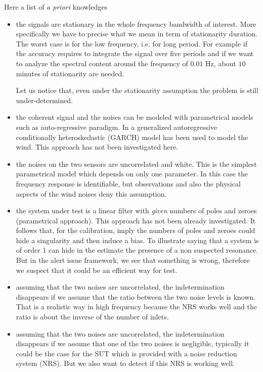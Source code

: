Here a list of {\it a priori} knowledges
\begin{itemize}
\item
 the signals are stationary in the whole frequency bandwidth of interest. More specifically we have to precise what we mean in term of stationarity duration. The worst case  is for the low frequency, i.e. for long period. For example if the accuracy requires to integrate the signal over five periods and if we want to analyze the spectral content around the frequency of $0.01$ Hz, about $10$ minutes of stationarity are needed.
 
Let us notice that, even under the stationarity assumption the problem is still under-determined.
 

  \item
the coherent signal and the noises can be modeled with parametrical models such as auto-regressive paradigm. In \cite{frazier:2013} a generalized autoregressive conditionally heteroskedastic (GARCH) model has been used to model the wind. This approach has not been investigated here.

  \item
 the noises on the two sensors are uncorrelated and white. This is the simplest parametrical model which depends on only one parameter. In this case the frequency response is identifiable, but observations and also the physical aspects of the wind noises deny this assumption.
   \item
the system under test is a linear filter with {\it given} numbers of poles and zeroes (parametrical approach). This approach has not been already investigated. It follows that, for the calibration, imply the numbers of poles and zeroes could hide a singularity and then induce a bias. To illustrate saying that a system is of order 1 can hide in the estimate the presence of a non suspected resonance. But in the alert issue framework, we  see that something is wrong, therefore we suspect that it could be an efficient way for test. 

\item
assuming that the two noises are uncorrelated, the indetermination disappears if  we assume that the ratio between the two noise levels is known. That is a realistic way in high frequency because the NRS works well and the ratio is about the inverse of the number of inlets.

\item
assuming that the two noises are uncorrelated, the indetermination disappears if  we assume that one of the two noises is negligible, typically it could be the case for the SUT which is provided with a noise reduction system (NRS). But we also want to detect if this NRS is working well.


\end{itemize}
